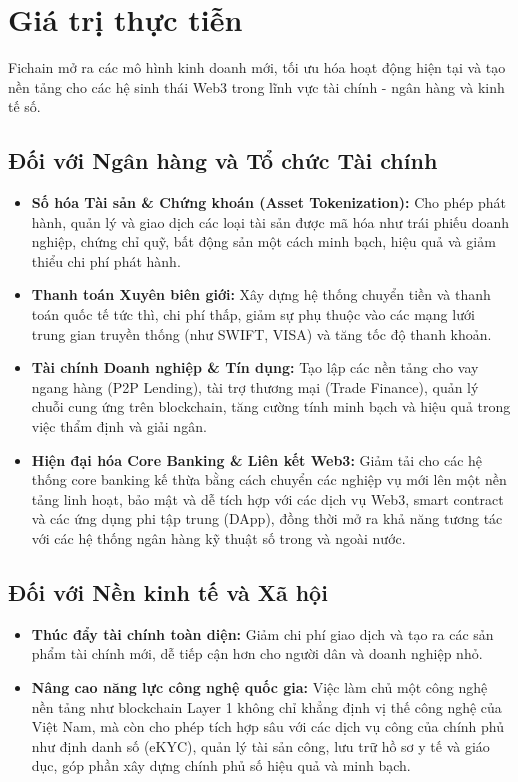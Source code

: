 \section{Giá trị thực tiễn}
Fichain mở ra các mô hình kinh doanh mới, tối ưu hóa hoạt động hiện tại và tạo nền tảng cho các hệ sinh thái Web3 trong lĩnh vực tài chính - ngân hàng và kinh tế số.

\subsection{Đối với Ngân hàng và Tổ chức Tài chính}
\begin{itemize}
    \item \textbf{Số hóa Tài sản \& Chứng khoán (Asset Tokenization):} Cho phép phát hành, quản lý và giao dịch các loại tài sản được mã hóa như trái phiếu doanh nghiệp, chứng chỉ quỹ, bất động sản một cách minh bạch, hiệu quả và giảm thiểu chi phí phát hành.
    \item \textbf{Thanh toán Xuyên biên giới:} Xây dựng hệ thống chuyển tiền và thanh toán quốc tế tức thì, chi phí thấp, giảm sự phụ thuộc vào các mạng lưới trung gian truyền thống (như SWIFT\cite{swift_website}, VISA\cite{visa_website}) và tăng tốc độ thanh khoản.
    \item \textbf{Tài chính Doanh nghiệp \& Tín dụng:} Tạo lập các nền tảng cho vay ngang hàng (P2P Lending), tài trợ thương mại (Trade Finance), quản lý chuỗi cung ứng trên blockchain, tăng cường tính minh bạch và hiệu quả trong việc thẩm định và giải ngân.
    \item \textbf{Hiện đại hóa Core Banking \& Liên kết Web3:} Giảm tải cho các hệ thống core banking kế thừa bằng cách chuyển các nghiệp vụ mới lên một nền tảng linh hoạt, bảo mật và dễ tích hợp với các dịch vụ Web3, smart contract và các ứng dụng phi tập trung (DApp), đồng thời mở ra khả năng tương tác với các hệ thống ngân hàng kỹ thuật số trong và ngoài nước.
\end{itemize}

\subsection{Đối với Nền kinh tế và Xã hội}
\begin{itemize}
    \item \textbf{Thúc đẩy tài chính toàn diện:} Giảm chi phí giao dịch và tạo ra các sản phẩm tài chính mới, dễ tiếp cận hơn cho người dân và doanh nghiệp nhỏ.
    \item \textbf{Nâng cao năng lực công nghệ quốc gia:} Việc làm chủ một công nghệ nền tảng như blockchain Layer 1 không chỉ khẳng định vị thế công nghệ của Việt Nam, mà còn cho phép tích hợp sâu với các dịch vụ công của chính phủ như định danh số (eKYC), quản lý tài sản công, lưu trữ hồ sơ y tế và giáo dục, góp phần xây dựng chính phủ số hiệu quả và minh bạch.
\end{itemize}
